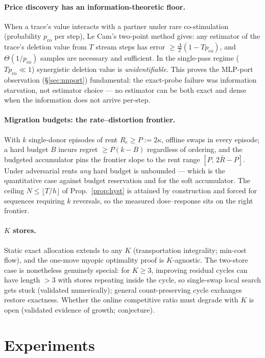 \documentclass[10pt,twocolumn]{article}
\theoremstyle{definition}
\begin{document}
\paragraph{Price discovery has an information-theoretic floor.}
When a trace's value interacts with a partner under rare co-stimulation (probability
$p_{\mathrm{co}}$ per step), Le Cam's two-point method gives: any estimator of the trace's
deletion value from $T$ stream steps has error $\ge\tfrac{\Delta}{2}(1-Tp_{\mathrm{co}})$,
and $\Theta(1/p_{\mathrm{co}})$ samples are necessary and sufficient. In the single-pass
regime ($Tp_{\mathrm{co}}\ll1$) synergistic deletion value is \emph{unidentifiable}. This
proves the MLP-port observation (\S\ref{sec:nnport}) fundamental: the exact-probe failure
was information starvation, not estimator choice --- no estimator can be both exact and
dense when the information does not arrive per-step.

\paragraph{Migration budgets: the rate--distortion frontier.}
With $k$ single-donor episodes of rent $R_e\ge P:=2\kappa$, offline swaps in every episode;
a hard budget $B$ incurs regret $\ge P(k-B)$ regardless of ordering, and the budgeted
accumulator pins the frontier slope to the rent range $[P,\,2\bar R-P]$. Under adversarial
rents \emph{any} hard budget is unbounded --- which is the quantitative case against
budget reservation and for the soft accumulator. The ceiling $N\le\lfloor T/h\rfloor$ of
Prop.~\ref{prop:hyst} is attained by construction and forced for sequences requiring
$k$ reversals, so the measured dose--response sits on the right frontier.

\paragraph{$K$ stores.}
Static exact allocation extends to any $K$ (transportation integrality; min-cost flow),
and the one-move myopic optimality proof is $K$-agnostic. The two-store case is nonetheless
genuinely special: for $K\ge3$, improving residual cycles can have length $>3$ with stores
repeating inside the cycle, so single-swap local search gets stuck (validated numerically);
general count-preserving cycle exchanges restore exactness. Whether the online competitive
ratio must degrade with $K$ is open (validated evidence of growth; conjecture).

\section{Experiments}\label{sec:evidence}
\end{document}
